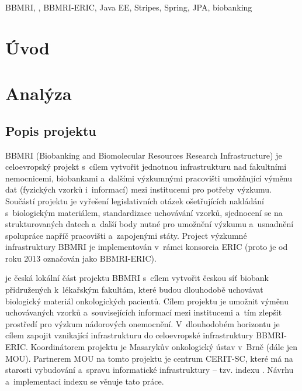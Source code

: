 \begin{ThesisKeyWords}
BBMRI, \ProjectName, BBMRI-ERIC, Java EE, Stripes, Spring, JPA, biobanking

\end{ThesisKeyWords}

\MainMatter

\tableofcontents

\chapter{Úvod}

\chapter{Analýza}

\section{Popis projektu \ProjectName}
BBMRI (Biobanking and Biomolecular Resources Research Infrastructure) je celoevropský projekt s~cílem vytvořit jednotnou infrastrukturu nad fakultními nemocnicemi, biobankami a~dalšími výzkumnými pracovišti umožňující výměnu dat (fyzických vzorků i~informací) mezi institucemi pro potřeby výzkumu. Součástí projektu je vyřešení legislativních otázek ošetřujících nakládání s~biologickým materiálem, standardizace uchovávání vzorků, sjednocení se na strukturovaných datech a~další body nutné pro umožnění výzkumu a~usnadnění spolupráce napříč pracovišti a~zapojenými státy. Project výzkumné infrastruktury BBMRI je implementován v~rámci konsorcia ERIC (proto je od roku 2013 označován jako BBMRI-ERIC).

\ProjectName je česká lokální část projektu BBMRI s~cílem vytvořit českou síť biobank přidružených k~lékařským fakultám, které budou dlouhodobě uchovávat biologický materiál onkologických pacientů. Cílem projektu je umožnit výměnu uchovávaných vzorků a~souvisejících informací mezi institucemi a~tím zlepšit prostředí pro výzkum nádorových onemocnění. V~dlouhodobém horizontu je cílem zapojit vznikající infrastrukturu \ProjectName do celoevropské infrastruktury BBMRI-ERIC.
Koordinátorem projektu je Masarykův onkologický ústav v~Brně (dále jen MOU). Partnerem MOU na tomto projektu je centrum CERIT-SC, které má na starosti vybudování a~spravu informatické infrastruktury – tzv. indexu \ProjectName. Návrhu a~implementaci indexu \ProjectName se věnuje tato práce.

